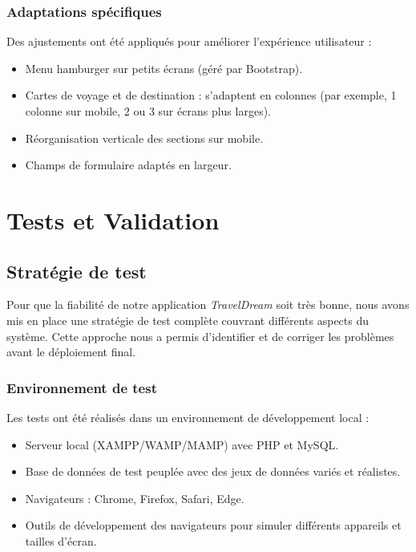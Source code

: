 \documentclass[a4paper,12pt]{article}
\begin{document}
\subsubsection{Adaptations spécifiques}
Des ajustements ont été appliqués pour améliorer l’expérience utilisateur :
\begin{itemize}
  \item Menu hamburger sur petits écrans (géré par Bootstrap).
  \item Cartes de voyage et de destination : s'adaptent en colonnes (par exemple, 1 colonne sur mobile, 2 ou 3 sur écrans plus larges).
  \item Réorganisation verticale des sections sur mobile.
  \item Champs de formulaire adaptés en largeur.
\end{itemize}

\section{Tests et Validation}

\subsection{Stratégie de test}
Pour que la fiabilité de notre application \textit{TravelDream} soit très bonne, nous avons mis en place une stratégie de test complète couvrant différents aspects du système. Cette approche nous a permis d'identifier et de corriger les problèmes avant le déploiement final.

\subsubsection{Environnement de test}
Les tests ont été réalisés dans un environnement de développement local :
\begin{itemize}
  \item Serveur local (XAMPP/WAMP/MAMP) avec PHP et MySQL.
  \item Base de données de test peuplée avec des jeux de données variés et réalistes.
  \item Navigateurs : Chrome, Firefox, Safari, Edge.
  \item Outils de développement des navigateurs pour simuler différents appareils et tailles d'écran.
\end{itemize}
\end{document}
